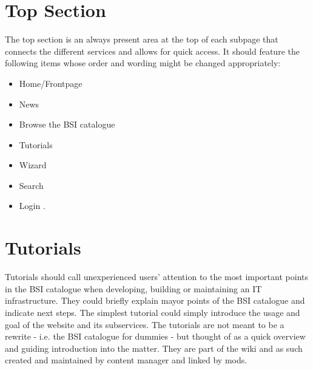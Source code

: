 \section{Top Section} 
\label{top_section}

The top section is an always present area at the top of each subpage that connects the different services and allows for quick access.
It should feature the following items whose order and wording might be changed appropriately:
\begin{itemize}
    \item Home/Frontpage
    \item News
    \item Browse the BSI catalogue
    \item Tutorials
    \item Wizard
    \item Search
    \item Login 
        . 
\end{itemize}


\section{Tutorials}
\label{tutorials}

Tutorials should call unexperienced users' attention to the most important points in the BSI catalogue when developing, building or maintaining an IT infrastructure.
They could briefly explain mayor points of the BSI catalogue and indicate next steps.
The simplest tutorial could simply introduce the usage and goal of the website and its subservices.
The tutorials are not meant to be a rewrite - i.e. the BSI catalogue for dummies - but thought of as a quick overview and guiding introduction into the matter.
They are part of the wiki and as such created and maintained by content manager and linked by mods.
